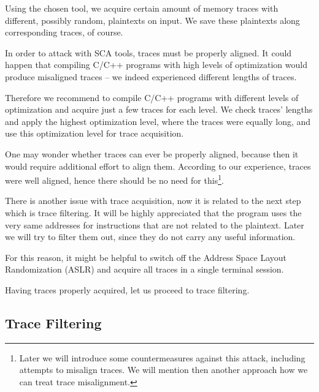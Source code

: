 Using the chosen tool, we acquire certain amount of memory traces with different, possibly random, plaintexts on input. We save these plaintexts along corresponding traces, of course.

\begin{note}
\label{note:optim}
	In order to attack with SCA tools, traces must be properly aligned. It could happen that compiling C/C++ programs with high levels of optimization would produce misaligned traces -- we indeed experienced different lengths of traces.
	
	Therefore we recommend to compile C/C++ programs with different levels of optimization and acquire just a few traces for each level. We check traces' lengths and apply the highest optimization level, where the traces were equally long, and use this optimization level for trace acquisition.
\end{note}

One may wonder whether traces can ever be properly aligned, because then it would require additional effort to align them. According to our experience, traces were well aligned, hence there should be no need for this\footnote{Later we will introduce some countermeasures against this attack, including attempts to misalign traces. We will mention then another approach how we can treat trace misalignment.}.

\begin{note}
\label{note:aslr}
	There is another issue with trace acquisition, now it is related to the next step which is trace filtering. It will be highly appreciated that the program uses the very same addresses for instructions that are not related to the plaintext. Later we will try to filter them out, since they do not carry any useful information.
	
	For this reason, it might be helpful to switch off the Address Space Layout Randomization (ASLR) and acquire all traces in a single terminal session.
\end{note}

Having traces properly acquired, let us proceed to trace filtering.



\subsection{Trace Filtering}
\label{sec:filter}


